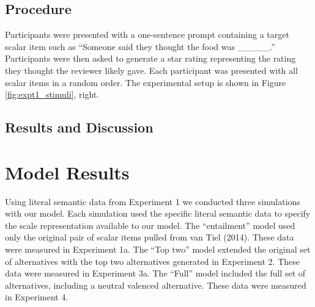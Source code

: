 \documentclass[10pt, letterpaper]{article}
\begin{document}
\subsection{Procedure}\label{procedure}

Participants were presented with a one-sentence prompt containing a
target scalar item such as ``Someone said they thought the food was
\_\_\_\_\_.'' Participants were then asked to generate a star rating
representing the rating they thought the reviewer likely gave. Each
participant was presented with all scalar items in a random order. The
experimental setup is shown in Figure \ref{fig:expt1_stimuli}, right.

\subsection{Results and Discussion}\label{results-and-discussion-2}

\section{Model Results}\label{model-results}

Using literal semantic data from Experiment 1 we conducted three
simulations with our model. Each simulation used the specific literal
semantic data to specify the scale representation available to our
model. The ``entailment'' model used only the original pair of scalar
items pulled from van Tiel (2014). These data were measured in
Experiment 1a. The ``Top two'' model extended the original set of
alternatives with the top two alternatives generated in Experiment 2.
These data were measured in Experiment 3a. The ``Full'' model included
the full set of alternatives, including a neutral valenced alternative.
These data were measured in Experiment 4.
\end{document}
